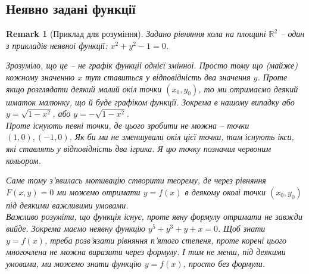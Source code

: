 \documentclass[a4paper, 10pt]{article}
\theoremstyle{theoremdd}
\theoremstyle{theoremdd}
\theoremstyle{theoremdd}
\theoremstyle{theoremdd}
\theoremstyle{theoremdd}
\theoremstyle{theoremdd}
\theoremstyle{theoremdd}
\newtheorem{remark}[theorem]{Remark}
\theoremstyle{theoremdd}
\theoremstyle{theoremdd}
\begin{document}
\subsection{Неявно задані функції}
\begin{remark}[Приклад для розуміння]
Задано рівняння кола на площині $\mathbb{R}^2$ -- один з прикладів неявної функції: $x^2+y^2-1=0$.
\begin{figure}[H]
\centering
{}
\end{figure}
Зрозуміло, що це -- не графік функції однієї змінної. Просто тому що (майже) кожному значенню $x$ тут ставиться у відповідність два значення $y$. Проте якщо розглядати деякий малий окіл точки $(x_0,y_0)$, то ми отримаємо деякий шматок малюнку, що й буде графіком функції. Зокрема в нашому випадку або $y = \sqrt{1-x^2}$, або $y = -\sqrt{1-x^2}$.\\
Проте існують певні точки, де цього зробити не можна -- точки $(1,0),(-1,0)$. Як би ми не зменшували окіл цієї точки, там існують ікси, які ставлять у відповідність два ігрика. Я цю точку позначил червоним кольором.
\begin{figure}[H]
\centering
{}
\end{figure}
Саме тому з'явилась мотивацію створити теорему, де через рівняння $F(x,y) = 0$ ми можемо отримати $y = f(x)$ в деякому околі точки $(x_0,y_0)$ під деякими важливими умовами.
\bigskip \\
Важливо розуміти, що функція існує, проте явну формулу отримати не завжди вийде. Зокрема маємо неявну функцію $y^5+y^3+y+x=0$. Щоб знати $y=f(x)$, треба розв'язати рівняння п'ятого степеня, проте корені цього многочлена не можна виразити через формулу. І тим не менш, під деякими умовами, ми можемо знати функцію $y=f(x)$, просто без формули.
\end{remark}
\end{document}
